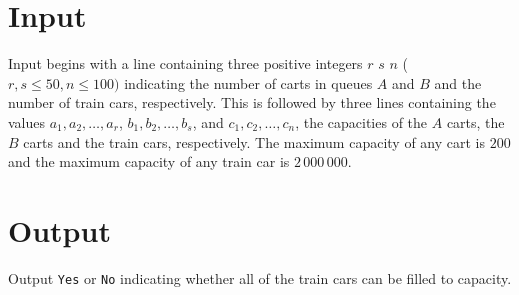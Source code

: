 \section*{Input}
Input begins with a line containing three positive integers $r$ $s$ $n$ ($r,s \leq 50, n \leq 100)$ indicating the number of carts in queues $A$ and $B$ and the number of train cars, respectively. This is followed by three lines containing the values $a_1, a_2, \ldots, a_r$, $b_1, b_2, \ldots, b_s$, and $c_1, c_2, \ldots, c_n$, the capacities of the $A$ carts, the $B$ carts and the train cars, respectively.  The maximum capacity of any cart is $200$ and the maximum capacity of any train car is $2\,000\,000$. 

\section*{Output}
Output {\tt Yes} or {\tt No} indicating whether all of the train cars can be filled to capacity.
